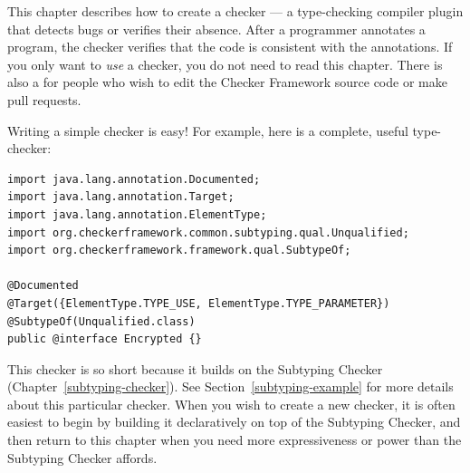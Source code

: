 \htmlhr
{}
\label{writing-a-checker} %

\newcommand{\TreeAPIBase}{https://docs.oracle.com/en/java/javase/11/docs/api/jdk.compiler/com/sun/source}
\newcommand{\refTreeclass}[2]{\href{\TreeAPIBase{}/#1/#2.html?is-external=true}{\<#2>}}
\newcommand{\ModelAPIBase}{https://docs.oracle.com/en/java/javase/11/docs/api/java.compiler/javax/lang/model}
\newcommand{\refModelclass}[2]{\href{\ModelAPIBase{}/#1/#2.html?is-external=true}{\<#2>}}

This chapter describes how to create a checker
--- a type-checking compiler plugin that detects bugs or verifies their
absence.  After a programmer annotates a program,
the checker verifies that the code is consistent
with the annotations.
If you only want to \emph{use} a checker, you do not need to read this
chapter.
There is also a
 for people who wish to edit the Checker Framework source code or
make pull requests.


Writing a simple checker is easy!  For example, here is a complete, useful
type-checker:

\begin{Verbatim}
import java.lang.annotation.Documented;
import java.lang.annotation.Target;
import java.lang.annotation.ElementType;
import org.checkerframework.common.subtyping.qual.Unqualified;
import org.checkerframework.framework.qual.SubtypeOf;

@Documented
@Target({ElementType.TYPE_USE, ElementType.TYPE_PARAMETER})
@SubtypeOf(Unqualified.class)
public @interface Encrypted {}
\end{Verbatim}

This checker is so short because it builds on the Subtyping Checker
(Chapter~\ref{subtyping-checker}).
See Section~\ref{subtyping-example} for more details about this particular checker.
When you wish to create a new checker, it is often easiest to begin by
building it declaratively on top of the Subtyping Checker, and then return to
this chapter when you need more expressiveness or power than the Subtyping
Checker affords.

